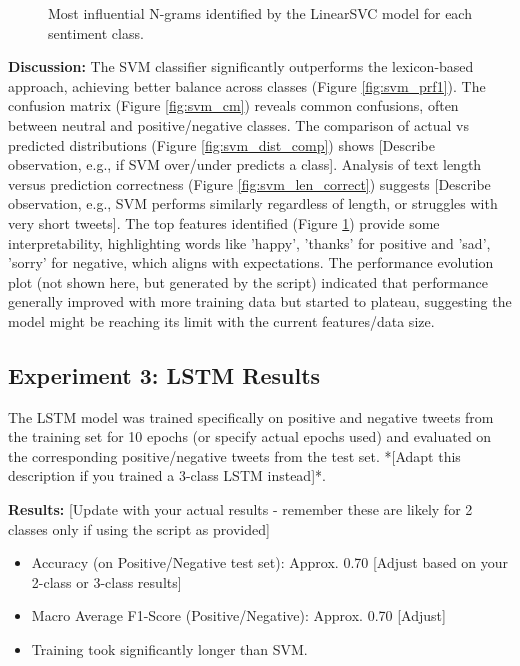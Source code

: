 \documentclass[10pt,twocolumn]{article}
\begin{document}
\begin{figure}[H]
    \centering
    \caption{Most influential N-grams identified by the LinearSVC model for each sentiment class.}
    \label{fig:svm_features}
\end{figure}


\textbf{Discussion:} The SVM classifier significantly outperforms the lexicon-based approach, achieving better balance across classes (Figure \ref{fig:svm_prf1}). The confusion matrix (Figure \ref{fig:svm_cm}) reveals common confusions, often between neutral and positive/negative classes. The comparison of actual vs predicted distributions (Figure \ref{fig:svm_dist_comp}) shows [Describe observation, e.g., if SVM over/under predicts a class]. Analysis of text length versus prediction correctness (Figure \ref{fig:svm_len_correct}) suggests [Describe observation, e.g., SVM performs similarly regardless of length, or struggles with very short tweets]. The top features identified (Figure \ref{fig:svm_features}) provide some interpretability, highlighting words like 'happy', 'thanks' for positive and 'sad', 'sorry' for negative, which aligns with expectations. The performance evolution plot (not shown here, but generated by the script) indicated that performance generally improved with more training data but started to plateau, suggesting the model might be reaching its limit with the current features/data size.

\subsection{Experiment 3: LSTM Results}
\label{subsec:exp_lstm}

The LSTM model was trained specifically on positive and negative tweets from the training set for 10 epochs (or specify actual epochs used) and evaluated on the corresponding positive/negative tweets from the test set. *[Adapt this description if you trained a 3-class LSTM instead]*.

\textbf{Results:} [Update with your actual results - remember these are likely for 2 classes only if using the script as provided]
\begin{itemize}[itemsep=0pt, topsep=3pt]
    \item Accuracy (on Positive/Negative test set): Approx. 0.70 [Adjust based on your 2-class or 3-class results]
    \item Macro Average F1-Score (Positive/Negative): Approx. 0.70 [Adjust]
    \item Training took significantly longer than SVM.
\end{itemize}
\end{document}
